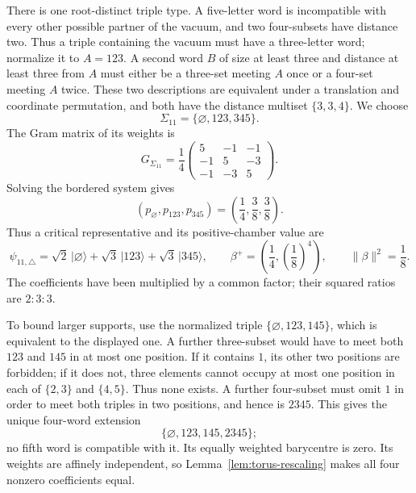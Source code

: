 \documentclass{article}
\theoremstyle{definition}
\theoremstyle{remark}
\newcommand{\ket}[1]{\lvert #1\rangle}
\newcommand{\norm}[1]{\lVert #1\rVert}
\begin{document}
There is one root-distinct triple type. A five-letter word is incompatible
with every other possible partner of the vacuum, and two four-subsets
have distance two. Thus a triple containing the vacuum must have a
three-letter word; normalize it to $A=123$.  A second word $B$ of size at least three
and distance at least three from $A$ must either be a three-set meeting
$A$ once or a four-set meeting $A$ twice.  These two descriptions are
equivalent under a translation and coordinate permutation, and both have
the distance multiset $\{3,3,4\}$.  We choose
\[
 \Sigma_{11}=\{\varnothing,123,345\}.
\]
The Gram matrix of its weights is
\[
 G_{\Sigma_{11}}
 =\frac14
 \begin{pmatrix}
 5&-1&-1\\
 -1&5&-3\\
 -1&-3&5
 \end{pmatrix}.
\]
Solving the bordered system gives
\[
 (p_\varnothing,p_{123},p_{345})
 =\left(\frac14,\frac38,\frac38\right).
\]
Thus a critical representative and its
positive-chamber value are
\begin{equation}
 \psi_{11,\triangle}
 =\sqrt2\,\ket\varnothing+\sqrt3\,\ket{123}
                  +\sqrt3\,\ket{345},
 \qquad
 \beta^+=\left(\frac14,
                    \left(\frac18\right)^4\right),
 \qquad
 \norm\beta^2=\frac18 .
 \label{eq:B5-triangle-critical}
\end{equation}
The coefficients have been multiplied by a common factor; their squared
ratios are $2:3:3$.

To bound larger supports, use the normalized triple
$\{\varnothing,123,145\}$, which is equivalent to the displayed one.
A further three-subset would have to meet both $123$ and $145$ in
at most one position. If it contains $1$, its other two positions are
forbidden; if it does not, three elements cannot occupy at most one
position in each of $\{2,3\}$ and $\{4,5\}$. Thus none exists.
A further four-subset must omit $1$ in order to meet both triples in
two positions, and hence is $2345$. This gives the unique four-word
extension
\[
 \{\varnothing,123,145,2345\};
\]
no fifth word is compatible with it. Its equally weighted barycentre is
zero. Its weights are affinely independent, so
Lemma~\ref{lem:torus-rescaling} makes all four nonzero coefficients equal.
\end{document}
